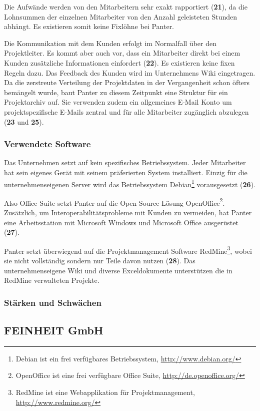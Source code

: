 Die Aufwände werden von den Mitarbeitern sehr exakt rapportiert (\textbf{21}),
da die Lohnsummen der einzelnen Mitarbeiter von den Anzahl geleisteten Stunden
abhängt. Es existieren somit keine Fixlöhne bei Panter.

Die Kommunikation mit dem Kunden erfolgt im Normalfall über den Projektleiter.
Es kommt aber auch vor, dass ein Mitarbeiter direkt bei einem Kunden zusätzliche
Informationen einfordert (\textbf{22}). Es existieren keine fixen Regeln dazu.
Das Feedback des Kunden wird im Unternehmens Wiki eingetragen. Da die zerstreute
Verteilung der Projektdaten in der Vergangenheit schon öfters bemängelt wurde, 
baut Panter zu diesem Zeitpunkt eine Struktur für ein Projektarchiv auf. Sie
verwenden zudem ein allgemeines E-Mail Konto um projektspezifische E-Mails
zentral und für alle Mitarbeiter zugänglich abzulegen (\textbf{23} und \textbf{25}).

\subsubsection{Verwendete Software}
Das Unternehmen setzt auf kein spezifisches Betriebssystem. Jeder Mitarbeiter
hat sein eigenes Gerät mit seinem präferierten System installiert. Einzig für
die unternehmenseigenen Server wird das Betriebssystem Debian\footnote{Debian 
ist ein frei verfügbares Betriebssystem, \url{http://www.debian.org/}} 
vorausgesetzt (\textbf{26}).

Also Office Suite setzt Panter auf die Open-Source
Lösung OpenOffice\footnote{OpenOffice ist eine frei verfügbare Office Suite, 
\url{http://de.openoffice.org/}}. Zusätzlich, um Interoperabilitätsprobleme
mit Kunden zu vermeiden, hat Panter eine Arbeitsstation mit Microsoft Windows
und Microsoft Office ausgerüstet (\textbf{27}).

Panter setzt überwiegend auf die Projektmanagement Software RedMine\footnote{RedMine
ist eine Webapplikation für Projektmanagement, \url{http://www.redmine.org/}},
wobei sie nicht vollständig sondern nur Teile davon nutzen (\textbf{28}). 
Das unternehmenseigene Wiki und diverse Exceldokumente unterstützen die in RedMine
verwalteten Projekte. 

\subsubsection{Stärken und Schwächen}

\subsection{FEINHEIT GmbH}

